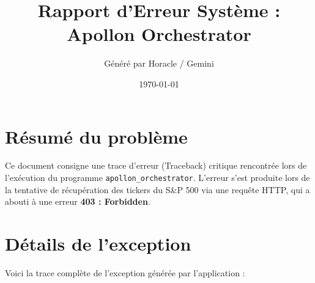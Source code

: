 \documentclass[12pt,a4paper]{article}
\title{\textbf{Rapport d'Erreur Système : Apollon Orchestrator}}
\author{Généré par Horacle / Gemini}
\date{\today}
\begin{document}
\maketitle

\section*{Résumé du problème}
Ce document consigne une trace d'erreur (Traceback) critique rencontrée lors de l'exécution du programme \texttt{apollon\_orchestrator}. L'erreur s'est produite lors de la tentative de récupération des tickers du S\&P 500 via une requête HTTP, qui a abouti à une erreur \textbf{403 : Forbidden}.

\section*{Détails de l'exception}
Voici la trace complète de l'exception générée par l'application :
\end{document}
